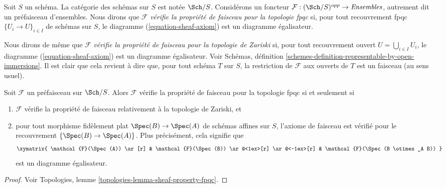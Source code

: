 \begin{definition}
\label{definition-sheaf-property-fpqc}
Soit $S$ un sch\'ema. La cat\'egorie des sch\'emas sur $S$ est not\'ee
$\Sch/S$. Consid\'erons un foncteur
$\mathcal{F} : (\Sch/S)^{opp} \to \textit{Ensembles}$, autrement dit
un pr\'efaisceau d'ensembles. Nous dirons que $\mathcal{F}$
{\it v\'erifie la propri\'et\'e de faisceau pour la topologie fpqc}
si, pour tout recouvrement fpqc $\{U_i \to U\}_{i \in I}$ de sch\'emas sur $S$,
le diagramme (\ref{equation-sheaf-axiom}) est un diagramme \'egalisateur.
\end{definition}

\noindent
Nous dirons de m\^eme que $\mathcal{F}$
{\it v\'erifie la propri\'et\'e de faisceau pour la topologie de Zariski} si, pour
tout recouvrement ouvert $U = \bigcup_{i \in I} U_i$, le diagramme
(\ref{equation-sheaf-axiom}) est un diagramme \'egalisateur. Voir
Sch\'emas, d\'efinition \ref{schemes-definition-representable-by-open-immersions}.
Il est clair que cela revient \`a dire que, pour tout sch\'ema $T$ sur $S$, la
restriction de $\mathcal{F}$ aux ouverts de $T$ est un faisceau (au sens usuel).

\begin{lemma}
\label{lemma-fpqc-sheaves}
Soit $\mathcal{F}$ un pr\'efaisceau sur $\Sch/S$. Alors
$\mathcal{F}$ v\'erifie la propri\'et\'e de faisceau pour la topologie fpqc
si et seulement si
\begin{enumerate}
\item $\mathcal{F}$ v\'erifie la propri\'et\'e de faisceau relativement \`a la
topologie de Zariski, et
\item pour tout morphisme fid\`element plat $\Spec(B) \to \Spec(A)$
de sch\'emas affines sur $S$, l'axiome de faisceau est v\'erifi\'e pour le recouvrement
$\{\Spec(B) \to \Spec(A)\}$. Plus pr\'ecis\'ement, cela signifie que
$$
\xymatrix{
\mathcal{F}(\Spec(A)) \ar[r] &
\mathcal{F}(\Spec(B)) \ar@<1ex>[r] \ar@<-1ex>[r] &
\mathcal{F}(\Spec(B \otimes_A B))
}
$$
est un diagramme \'egalisateur.
\end{enumerate}
\end{lemma}

\begin{proof}
Voir Topologies, lemme \ref{topologies-lemma-sheaf-property-fpqc}.
\end{proof}

